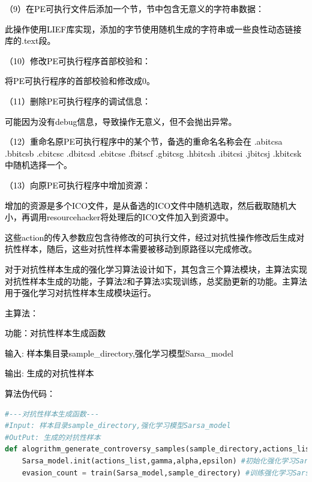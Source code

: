\textcolor{black}{（9）在PE可执行文件后添加一个节，节中包含无意义的字符串数据：}

\textcolor{black}{此操作使用LIEF库实现，添加的字节使用随机生成的字符串或一些良性动态链接库的.text段。}

\textcolor{black}{（10）修改PE可执行程序首部校验和：}

\textcolor{black}{将PE可执行程序的首部校验和修改成0。}

\textcolor{black}{（11）删除PE可执行程序的调试信息：}

\textcolor{black}{可能因为没有debug信息，导致操作无意义，但不会抛出异常。}

\textcolor{black}{（12）重命名原PE可执行程序中的某个节，备选的重命名名称会在
.abitcsa .bbitcsb .cbitcsc .dbitcsd .ebitcse .fbitscf .gbitcsg .hbitcsh .ibitcsi .jbitcsj .kbitcsk中随机选择一个。
}

\textcolor{black}{（13）向原PE可执行程序中增加资源：}

\textcolor{black}{增加的资源是多个ICO文件，是从备选的ICO文件中随机选取，然后截取随机大小，再调用resourcehacker将处理后的ICO文件加入到资源中。}

\textcolor{black}{这些action的传入参数应包含待修改的可执行文件，经过对抗性操作修改后生成对抗性样本，随后，这些对抗性样本需要被移动到原路径以完成修改。}

\textcolor{black}{对于对抗性样本生成的强化学习算法设计如下，其包含三个算法模块，主算法实现对抗性样本生成的功能，子算法2和子算法3实现训练，总奖励更新的功能。主算法用于强化学习对抗性样本生成模块运行。}

\textcolor{black}{主算法：}

\textcolor{black}{功能：对抗性样本生成函数}

\textcolor{black}{输入: 样本集目录sample\_directory,强化学习模型Sarsa\_model }

\textcolor{black}{输出: 生成的对抗性样本}

\textcolor{black}{算法伪代码：}

\begin{lstlisting}[language=Python, caption={}, label={lst:pythonfile1}]
#---对抗性样本生成函数---
#Input: 样本目录sample_directory,强化学习模型Sarsa_model 
#OutPut: 生成的对抗性样本
def alogrithm_generate_controversy_samples(sample_directory,actions_list,Sarsa_model):
    Sarsa_model.init(actions_list,gamma,alpha,epsilon) #初始化强化学习Sarsa模型，传入待训练的样本集路径，行为集，学习率，探索率，折扣因子
    evasion_count = train(Sarsa_model,sample_directory) #训练强化学习Sarsa模型
\end{lstlisting}

